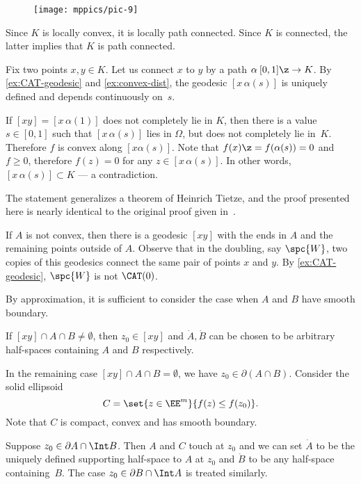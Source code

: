 \begin{wrapfigure}{o}{45 mm}
\vskip-4mm
\centering
\texttt{[image: mppics/pic-9]}
\end{wrapfigure}

Since $K$ is locally convex,
it is locally path connected.
Since $K$ is connected, the latter implies that $K$ is path connected.

Fix two points $x,y\in K$. 
Let us connect $x$ to $y$ by a path $\alpha\:[0,1]\z\to K$.
By \ref{ex:CAT-geodesic} and \ref{ex:convex-dist}, the geodesic $[x\,\alpha(s)]$ 
is uniquely defined and depends continuously on~$s$.

If $[xy]=[x\,\alpha(1)]$ does not completely lie in $K$, then 
there is a value $s\in [0,1]$ such that $[x\,\alpha(s)]$ 
lies in $\Omega$,
but does not completely lie in~$K$.
Therefore $f$ is convex 
along $[x\alpha(s)]$.
Note that $f(x)\z=f(\alpha(s))=0$ and $f\ge 0$, 
therefore $f(z)= 0$ for any $z\in [x\,\alpha(s)]$.
In other words, $[x\,\alpha(s)]\subset K$ --- a contradiction.

The statement generalizes a theorem of Heinrich Tietze, and the proof presented here is nearly identical to the original proof given in~\cite{tietze}.

If $A$ is not convex, then there is a geodesic $[xy]$ with the ends in $A$ and the remaining points outside of $A$.
Observe that in the doubling, say $\spc{W}$, two copies of this geodesics connect the same pair of points $x$ and $y$.
By \ref{ex:CAT-geodesic}, $\spc{W}$ is not $\CAT(0)$.

By approximation, it is sufficient to consider the case when 
$A$ and $B$ have smooth boundary. 

If $[xy]\cap A\cap B\ne \emptyset$, then $z_0\in [xy]$ and $\dot A, \dot B$ can be chosen to be arbitrary half-spaces containing $A$ and $B$ respectively.  

In the remaining case $[xy]\cap A\cap B=\emptyset$, 
we have $z_0\in\partial (A\cap B)$.  
Consider the solid ellipsoid
\[C=\set{z\in\EE^m}{f(z)\le f(z_0)}.\] 
Note that $C$ is compact, convex and has  smooth boundary. 

Suppose $z_0\in\partial  A \cap \Int B$. 
Then $A$ and $C$ touch at $z_0$ and we can set $\dot A$ to be the uniquely defined supporting half-space to $A$  at $z_0$ and $\dot B$ to be any half-space containing~$B$. 
The case $z_0\in\partial B \cap \Int A$ is treated similarly.


